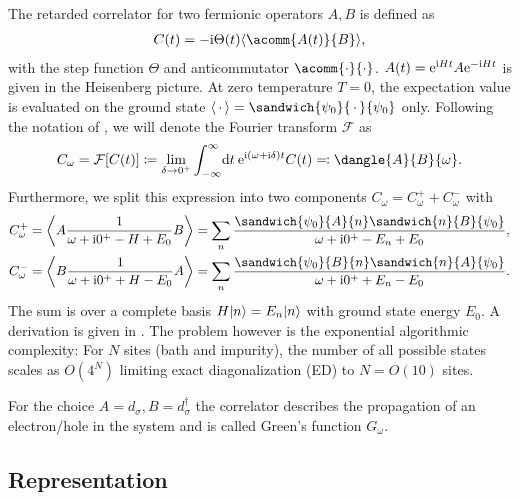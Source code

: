 The retarded correlator for two fermionic operators $A, B$ is defined as
\begin{align}
    C(t) = -\mi \Theta(t) \expval{\acomm{A(t)}{B}},
\end{align}
with the step function $\Theta$ and anticommutator $\acomm{\cdot}{\cdot}$.
$A(t) = \mathrm{e}^{\mathrm{i} H t} A \mathrm{e}^{-\mathrm{i} H t}$ is given in the Heisenberg picture.
At zero temperature $T=0$, the expectation value is evaluated on the ground state
$\expval{\,\cdot\,} = \sandwich{\psi_0}{\,\cdot\,}{\psi_0}$ only.
Following the notation of \cite{Bulla1998,Kugler2022},
we will denote the Fourier transform $\mathcal{F}$ as
\begin{equation}
    C_\omega
    =
    \mathcal{F}[C(t)]
    \coloneq
    \lim_{\delta\to0^+}
    \int_{-\infty}^\infty\! \md t\> \me^{\mi (\omega + \mi\delta) t} C(t)
    \eqcolon
    \dangle{A}{B}{\omega}.
\end{equation}
Furthermore,
we split this expression into two components $C_\omega = C^+_\omega + C^-_\omega$ with
\begin{subequations}
    \begin{align}
        C^+_\omega
         & =
        \expval*{A \frac{1}{\omega + \mi0^+ - H + E_0} B}
        =
        \sum_n \frac{\sandwich{\psi_0}{A}{n}\sandwich{n}{B}{\psi_0}}{\omega + \mi0^+ - E_n + E_0}, \\
        C^-_\omega
         & =
        \expval*{B \frac{1}{\omega + \mi0^+ + H - E_0} A}
        =
        \sum_n \frac{\sandwich{\psi_0}{B}{n}\sandwich{n}{A}{\psi_0}}{\omega + \mi0^+ + E_n - E_0}.
    \end{align}
\end{subequations}
The sum is over a complete basis $H\lvert n\rangle = E_n\lvert n\rangle$ with ground state energy $E_0$.
A derivation is given in .
The problem however is the exponential algorithmic complexity:
For $N$ sites (bath and impurity), the number of all possible states scales as $O(4^N)$
limiting exact diagonalization (ED) to $N=O(10)$ sites.

For the choice $A=d_\sigma, B=d_\sigma^\dag$ the correlator describes
the propagation of an electron/hole in the system and is called Green's function $G_\omega$.

\subsection{Representation}

